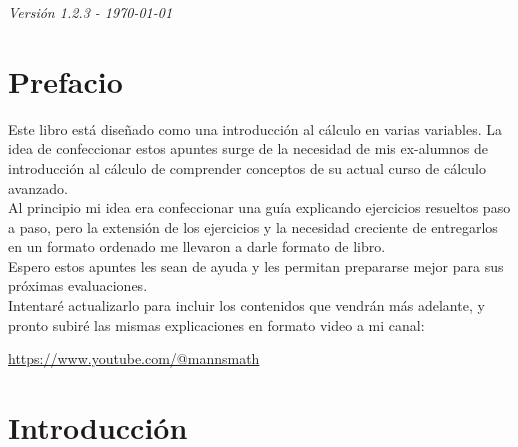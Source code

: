 \documentclass[12pt,openany]{book}
\begin{document}
\newpage
\begin{center}
    \vspace{1cm}
    \textit{Versión 1.2.3 - \today}
\end{center}

\chapter*{Prefacio}
Este libro está diseñado como una introducción al cálculo en varias variables. La idea de confeccionar estos apuntes surge de la necesidad de mis ex-alumnos de introducción al cálculo de comprender conceptos de su actual curso de cálculo avanzado.\\

Al principio mi idea era confeccionar una guía explicando ejercicios resueltos paso a paso, pero la extensión de los ejercicios y la necesidad creciente de entregarlos en un formato ordenado me llevaron a darle formato de libro.\\

Espero estos apuntes les sean de ayuda y les permitan prepararse mejor para sus próximas evaluaciones.\\ 

Intentaré actualizarlo para incluir los contenidos que vendrán más adelante, y pronto subiré las mismas explicaciones en formato video a mi canal:

\url{https://www.youtube.com/@mannsmath}


\thispagestyle{empty}
\mbox{}
\newpage

\chapter*{Introducción}





\end{document}
